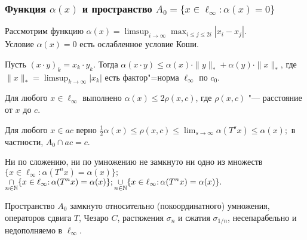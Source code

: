 \begin{varwidth}[v]{0.52\linewidth}
	\frametitle{Функция $\alpha(x)$ и пространство $A_0=\{x\in\ell_\infty:\alpha(x)=0\}$~\cite{avdeev2019space,our-ped-2018-alpha-Tx,our-vzms-2018}}

	Рассмотрим функцию
	$\displaystyle
		\alpha(x) = \limsup_{i\to\infty} \max_{i \leq j \leq 2i} |x_i-x_j|
	$.
	\\
	Условие $\alpha(x) = 0$ есть ослабленное условие Коши.
	\vspace{0.25em}



	\begin{theorem}
		Пусть $(x\cdot y)_k = x_k\cdot y_k$.
		Тогда
		$\alpha(x\cdot y)\leq \alpha(x)\cdot \|y\|_* + \alpha(y)\cdot \|x\|_*$,
		где
		$\displaystyle\|x\|_* = \limsup_{k\to\infty} |x_k|$
		есть фактор"=норма $\ell_\infty$ по $c_0$.
	\end{theorem}
	\begin{lemma}
		Для любого $x\in\ell_\infty$
		выполнено
		$
			\alpha(x) \leq 2\rho(x, c)
		$,
		где $\rho(x,c)$ "--- расстояние от $x$ до $c$.
	\end{lemma}
	\begin{theorem}
		Для любого $x\in ac$ верно
		$\displaystyle
			\frac{1}{2} \alpha(x) \leq \rho(x,c)\leq \lim_{s\to\infty} \alpha(T^s x) \leq \alpha(x)
			;
		$
		в частности, $A_0 \cap ac = c$.
	\end{theorem}
	\vspace{0.2em}
	\begin{theorem}
		Ни по сложению, ни по умножению не замкнуто ни  одно из множеств
		$\displaystyle
			\{x \in \ell_\infty : \alpha(T^n x) = \alpha(x) \};%
		$
		\\$\displaystyle
			{\mathop{\cap}\limits_{n\in\mathbb{N}}\{x \in \ell_\infty {:\,} \alpha(T^n x) = \alpha(x) \};
		\hfill
		\displaystyle
			\mathop{\cup}_{n\in\mathbb{N}}\{x \in \ell_\infty {:\,} \alpha(T^n x) = \alpha(x) \}
			.}
		$
		\vspace{-1em}
	\end{theorem}

	\begin{theorem}
		Пространство $A_0$ замкнуто относительно
		(покоординатного) умножения,
		операторов сдвига $T$, Чезаро $C$,
		растяжения $\sigma_n$ и сжатия $\sigma_{1/n}$,
		несепарабельно и недополняемо в $\ell_\infty$.
	\end{theorem}


\end{varwidth}
